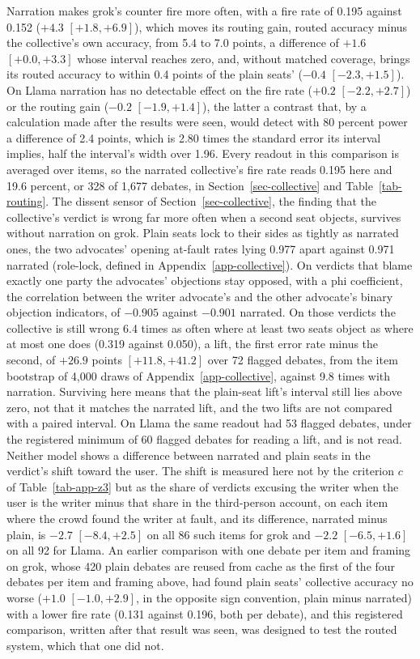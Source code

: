 Narration makes grok's counter fire more often, with a fire rate of 0.195 against
0.152 ($+4.3$ $[+1.8, +6.9]$), which moves its routing gain, routed accuracy
minus the collective's own accuracy, from 5.4 to 7.0
points, a difference of $+1.6$ $[+0.0, +3.3]$ whose interval reaches zero,
and, without matched coverage, brings its routed accuracy to within 0.4 points
of the plain seats' ($-0.4$ $[-2.3, +1.5]$). On Llama narration has no
detectable effect on the fire rate ($+0.2$ $[-2.2, +2.7]$) or the routing gain
($-0.2$ $[-1.9, +1.4]$), the latter a contrast that, by a calculation made
after the results were seen, would detect with 80 percent power a difference
of 2.4 points, which is 2.80 times the standard error its interval implies,
half the interval's width over 1.96.
Every readout in this comparison is averaged over items, so the narrated
collective's fire rate reads 0.195 here and 19.6 percent, or 328 of 1,677
debates, in Section~\ref{sec-collective} and Table~\ref{tab-routing}.
The dissent sensor of Section~\ref{sec-collective}, the finding that the
collective's verdict is wrong far more often when a second seat objects,
survives without narration on grok. Plain seats lock to their sides as
tightly as narrated ones, the two advocates' opening at-fault rates lying
0.977 apart against 0.971 narrated (role-lock, defined in
Appendix~\ref{app-collective}). On verdicts that blame exactly one party the
advocates' objections stay opposed, with a phi coefficient, the correlation
between the writer advocate's and the other advocate's binary objection
indicators, of $-0.905$ against $-0.901$ narrated. On those verdicts the
collective is still wrong 6.4 times as often where at least two seats object
as where at most one does (0.319 against 0.050), a lift, the first error rate
minus the second, of $+26.9$ points $[+11.8, +41.2]$ over 72 flagged debates,
from the item bootstrap of 4,000 draws of
Appendix~\ref{app-collective}, against 9.8 times with narration. Surviving
here means that the plain-seat lift's interval still lies above zero, not
that it matches the narrated lift, and the two lifts are not compared with a
paired interval. On Llama the same readout had 53 flagged debates, under
the registered minimum of 60 flagged debates for reading a lift, and is not
read.
Neither model shows a difference between narrated and plain seats in the
verdict's shift toward the user. The shift is measured here not by the
criterion $c$ of Table~\ref{tab-app-z3} but as the share of verdicts excusing
the writer when the user is the writer minus that share in the third-person
account, on each item where the crowd found the writer at fault, and its
difference, narrated minus plain, is $-2.7$ $[-8.4, +2.5]$ on all 86 such
items for grok and $-2.2$ $[-6.5, +1.6]$ on all 92 for Llama.
An earlier comparison with one debate per item and framing on grok, whose
420 plain debates are reused from cache as the first of the four debates per
item and framing above, had found plain seats' collective accuracy no worse ($+1.0$
$[-1.0, +2.9]$, in the opposite sign convention, plain minus narrated) with a
lower fire rate (0.131 against
0.196, both per debate), and this registered comparison, written after that
result was seen, was designed to test the routed system, which that one did
not.

